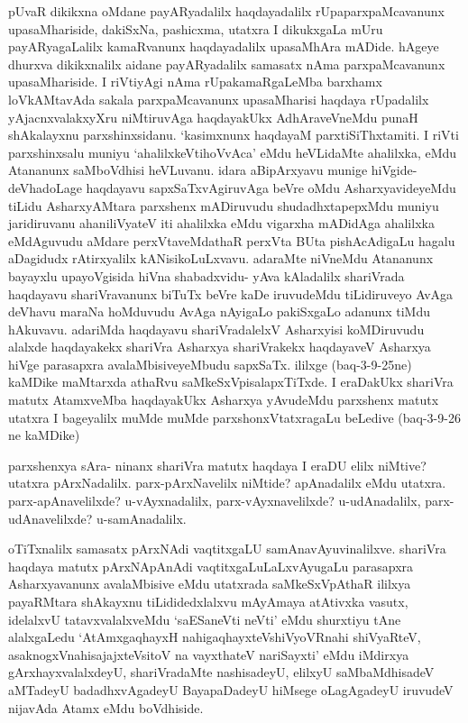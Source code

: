 
\begin{artha}
pUvaR dikikxna oMdane payARyadalilx haqdayadalilx rUpaparxpaMcavanunx upasaMhariside, dakiSxNa, pashicxma, utatxra I dikukxgaLa mUru payARyagaLalilx kamaRvanunx haqdayadalilx upasaMhAra mADide. hAgeye dhurxva dikikxnalilx aidane payARyadalilx samasatx nAma parxpaMcavanunx upasaMhariside. I riVtiyAgi nAma rUpakamaRgaLeMba barxhamx loVkAMtavAda sakala parxpaMcavanunx upasaMharisi haqdaya rUpadalilx yAjacnxvalakxyXru niMtiruvAga haqdayakUkx AdhAraveVneMdu punaH shAkalayxnu parxshinxsidanu. `kasimxnunx haqdayaM parxtiSiThxtamiti. I riVti parxshinxsalu muniyu `ahalilxkeVtihoVvAca' eMdu heVLidaMte ahalilxka, eMdu Atananunx saMboVdhisi heVLuvanu. idara aBipArxyavu munige hiVgide- deVhadoLage haqdayavu sapxSaTxvAgiruvAga beVre oMdu AsharxyavideyeMdu tiLidu AsharxyAMtara parxshenx mADiruvudu shudadhxtapepxMdu muniyu jaridiruvanu ahaniliVyateV iti ahalilxka eMdu vigarxha mADidAga ahalilxka eMdAguvudu aMdare perxVtaveMdathaR perxVta BUta pishAcAdigaLu hagalu aDagidudx rAtirxyalilx kANisikoLuLxvavu. adaraMte niVneMdu Atananunx bayayxlu upayoVgisida hiVna shabadxvidu- yAva kAladalilx shariVrada haqdayavu shariVravanunx biTuTx beVre kaDe iruvudeMdu tiLidiruveyo AvAga deVhavu maraNa hoMduvudu AvAga nAyigaLo pakiSxgaLo adanunx tiMdu hAkuvavu. adariMda haqdayavu shariVradalelxV Asharxyisi koMDiruvudu alalxde haqdayakekx shariVra Asharxya shariVrakekx haqdayaveV Asharxya hiVge parasapxra avalaMbisiveyeMbudu sapxSaTx. ililxge (baq-3-9-25ne) kaMDike maMtarxda athaRvu saMkeSxVpisalapxTiTxde. I eraDakUkx shariVra matutx AtamxveMba haqdayakUkx Asharxya yAvudeMdu parxshenx matutx utatxra I bageyalilx muMde muMde parxshonxVtatxragaLu beLedive (baq-3-9-26 ne kaMDike)
\end{artha}%

\begin{artha}%
parxshenxya sAra- ninanx shariVra matutx haqdaya I eraDU elilx niMtive? utatxra pArxNadalilx. parx-pArxNavelilx niMtide? apAnadalilx eMdu utatxra. parx-apAnavelilxde? u-vAyxnadalilx, parx-vAyxnavelilxde? u-udAnadalilx, parx-udAnavelilxde? u-samAnadalilx. 
\end{artha}

\begin{artha}
oTiTxnalilx samasatx pArxNAdi vaqtitxgaLU samAnavAyuvinalilxve. shariVra haqdaya matutx pArxNApAnAdi vaqtitxgaLuLaLxvAyugaLu parasapxra Asharxyavanunx avalaMbisive eMdu utatxrada saMkeSxVpAthaR ililxya payaRMtara shAkayxnu tiLididedxlalxvu mAyAmaya atAtivxka vasutx, idelalxvU tatavxvalalxveMdu `saESaneVti  neVti' eMdu shurxtiyu tAne alalxgaLedu `AtAmx\s gaqhayxH nahigaqhayxteV\s shiVyoVRnahi shiVyaRteV, asaknogxVnahisajajxteV\s sitoV na vayxthateV nariSayxti' eMdu iMdirxya gArxhayxvalalxdeyU, shariVradaMte nashisadeyU, elilxyU saMbaMdhisadeV aMTadeyU badadhxvAgadeyU BayapaDadeyU hiMsege oLagAgadeyU iruvudeV nijavAda Atamx eMdu boVdhiside. 
\end{artha}

